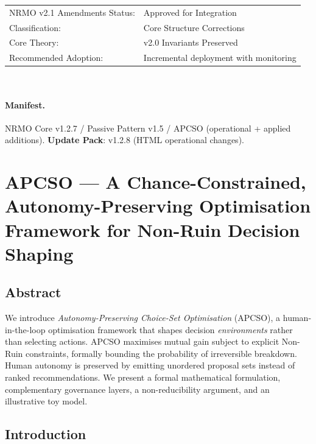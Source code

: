 \begin{tabular}{ll}
NRMO v2.1 Amendments Status: & Approved for Integration \\
Classification:               & Core Structure Corrections \\
Core Theory:                  & v2.0 Invariants Preserved \\
Recommended Adoption:         & Incremental deployment with
monitoring \\
\end{tabular}\\[0.4em]

\paragraph{Manifest.}
NRMO Core v1.2.7 / Passive Pattern v1.5 / APCSO (operational +
applied additions).
\textbf{Update Pack}: v1.2.8 (HTML operational changes).

\section{APCSO --- A Chance-Constrained, Autonomy-Preserving
Optimisation Framework for Non-Ruin Decision Shaping}
\label{sec:apcso-formal}


\subsection{Abstract}

We introduce \emph{Autonomy-Preserving Choice-Set Optimisation}
(APCSO), a human-in-the-loop optimisation framework that shapes
decision \emph{environments} rather than selecting actions. APCSO
maximises mutual gain subject to explicit Non-Ruin constraints,
formally bounding the probability of irreversible breakdown. Human
autonomy is preserved by emitting unordered proposal sets instead of
ranked recommendations. We present a formal mathematical
formulation, complementary governance layers, a non-reducibility
argument, and an illustrative toy model.

\subsection{Introduction}

